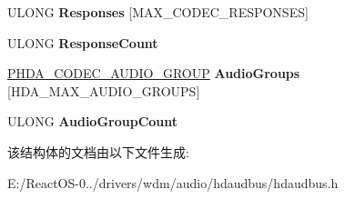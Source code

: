 \begin{DoxyCompactItemize}
U\+L\+O\+NG {\bfseries Responses} \mbox{[}M\+A\+X\+\_\+\+C\+O\+D\+E\+C\+\_\+\+R\+E\+S\+P\+O\+N\+S\+ES\mbox{]}
\item 
\mbox{\label{struct_h_d_a___c_o_d_e_c___e_n_t_r_y_a2fa059763ebd443794311eb2ef9af0ee}} 
U\+L\+O\+NG {\bfseries Response\+Count}
\item 
\mbox{\label{struct_h_d_a___c_o_d_e_c___e_n_t_r_y_a0697c141d399b0b1f0a5522770ff4f64}} 
\hyperlink{struct_h_d_a___c_o_d_e_c___a_u_d_i_o___g_r_o_u_p}{P\+H\+D\+A\+\_\+\+C\+O\+D\+E\+C\+\_\+\+A\+U\+D\+I\+O\+\_\+\+G\+R\+O\+UP} {\bfseries Audio\+Groups} \mbox{[}H\+D\+A\+\_\+\+M\+A\+X\+\_\+\+A\+U\+D\+I\+O\+\_\+\+G\+R\+O\+U\+PS\mbox{]}
\item 
\mbox{\label{struct_h_d_a___c_o_d_e_c___e_n_t_r_y_ae82930fc327e14e87b5e74a00cb4fc69}} 
U\+L\+O\+NG {\bfseries Audio\+Group\+Count}
\end{DoxyCompactItemize}


该结构体的文档由以下文件生成\+:\begin{DoxyCompactItemize}
\item 
E\+:/\+React\+O\+S-\/0../drivers/wdm/audio/hdaudbus/hdaudbus.\+h\end{DoxyCompactItemize}
